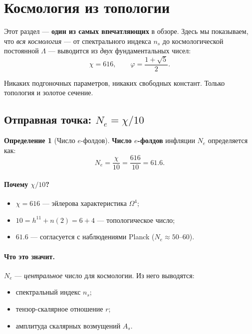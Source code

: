 \documentclass[11pt,a4paper]{article}
\newcommand{\Om}{\Omega^4}
\theoremstyle{definition}
\newtheorem{definition}[theorem]{Определение}
\begin{document}
\section{Космология из топологии}
\label{sec:cosmology}

Этот раздел — \textbf{один из самых впечатляющих} в обзоре. 
Здесь мы показываем, что \emph{вся космология} — от 
спектрального индекса $n_s$ до космологической постоянной 
$\Lambda$ — выводится из \emph{двух} фундаментальных чисел:
\begin{equation}
    \chi = 616, \qquad \varphi = \frac{1 + \sqrt{5}}{2}.
\end{equation}

Никаких подгоночных параметров, никаких свободных констант. 
Только топология и золотое сечение.

\subsection{Отправная точка: $N_e = \chi/10$}
\label{subsec:ne-folds}

\begin{definition}[Число $e$-фолдов]
\label{def:ne-folds}
\textbf{Число $e$-фолдов} инфляции $N_e$ определяется как:
\begin{equation}
    \boxed{
    N_e = \frac{\chi}{10} = \frac{616}{10} = 61.6.
    }
    \label{eq:ne-folds}
\end{equation}
\end{definition}

\paragraph{Почему $\chi/10$?}
\begin{itemize}
    \item $\chi = 616$ — эйлерова характеристика $\Om$;
    \item $10 = h^{11} + n(2) = 6 + 4$ — топологическое число;
    \item $61.6$ — согласуется с наблюдениями Planck 
          ($N_e \approx 50$--$60$).
\end{itemize}

\paragraph{Что это значит.}
$N_e$ — \emph{центральное} число для космологии. Из него 
выводятся:
\begin{itemize}
    \item спектральный индекс $n_s$;
    \item тензор-скалярное отношение $r$;
    \item амплитуда скалярных возмущений $A_s$.
\end{itemize}
\end{document}
